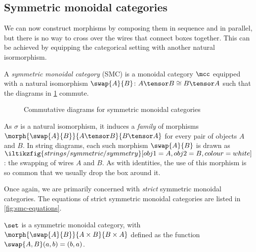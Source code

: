 \subsection{Symmetric monoidal categories}

We can now construct morphisms by composing them in sequence and in parallel,
but there is no way to cross over the wires that connect boxes together.
This can be achieved by equipping the categorical setting with another natural
isormorphism.

\begin{definition}
    \label{def:symmetric-monoidal-category}
    A \emph{symmetric monoidal category} (SMC) is a monoidal category \(\mcc\)
    equipped with a natural isomorphism \(
    \swap{A}{B} \colon A \tensor B \cong B \tensor A
    \) such that the diagrams in \cref{fig:smc-diagrams} commute.
\end{definition}

\begin{figure}
    \centering
    
    

    \vspace{1em}

    
    \caption{Commutative diagrams for symmetric monoidal categories}
    \label{fig:smc-diagrams}
\end{figure}

As \(\sigma\) is a natural isomorphism, it induces
a \emph{family} of morphisms \(
\morph{\swap{A}{B}}{A \tensor B}{B \tensor A}
\) for every pair of objects \(A\) and \(B\).
In string diagrams, each such morphism \(\swap{A}{B}\) is drawn as \(
\iltikzfig{strings/symmetric/symmetry}[obj1=A, obj2=B, colour=white]
\): the swapping of wires \(A\) and \(B\).
As with identities, the use of this morphism is so common that we usually
drop the box around it.

Once again, we are primarily concerned with \emph{strict} symmetric
monoidal categories.
The equations of strict symmetric monoidal categories are listed in
\cref{fig:smc-equations}.



\begin{example}
    \(\set\) is a symmetric monoidal category, with \(
    \morph{\swap{A}{B}}{A \times B}{B \times A}
    \) defined as the function \(\swap{A,B}(a, b) = (b, a)\).
\end{example}